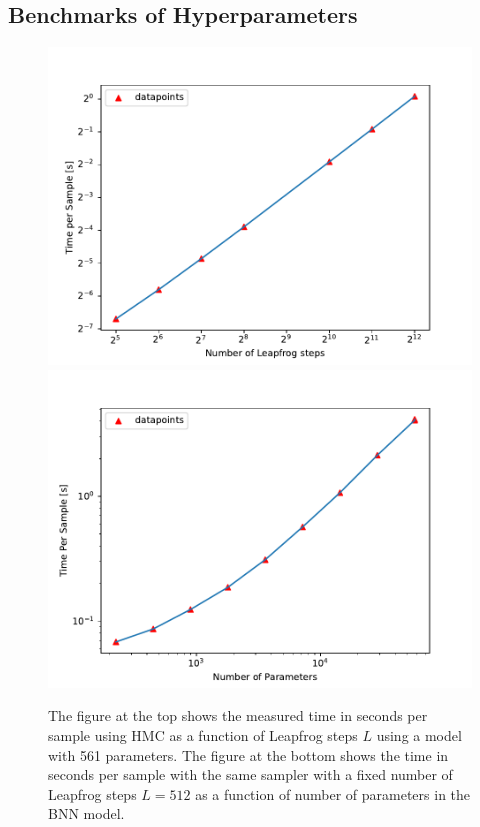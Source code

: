\subsection{Benchmarks of Hyperparameters}\label{subsec:benchmarks}
\begin{figure}[h!]
    \centering
    \includegraphics[scale=0.7]{figures/computational_cost/time_vs_leapfrogsteps_hmc.pdf}
    \includegraphics[scale=0.7]{figures/computational_cost/time_vs_params.pdf}
    \caption{The figure at the top shows the measured time in seconds per sample using HMC as a function of Leapfrog steps $L$ using a model with
    561 parameters. The figure at the bottom shows the time in seconds per sample with the same sampler with a fixed number of Leapfrog steps $L = 512$ as a function of number of parameters in the BNN model.
    }
    \label{fig:time_vs_leapfrogsteps}
\end{figure}

